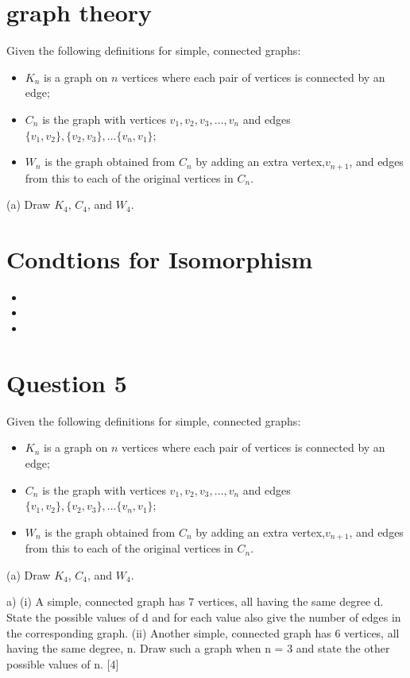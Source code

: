 \documentclass[]{report}
\begin{document}
\section{graph theory }
Given the following definitions for simple, connected graphs:
\begin{itemize}
\item $K_n$ is a graph on $n$ vertices where each pair of vertices is connected by an edge;
\item $C_n$ is the graph with vertices $v_1, v_2, v_3, \dots, v_n$ and edges $\{v_1,v_2\}, \{v_2,v_3\}, \dots\{v_n, v_1\}$;
\item $W_n$ is the graph obtained from $C_n$ by adding an extra vertex,$v_{n+1}$, and edges
from this to each of the original vertices in $C_n$.
\end{itemize}
(a) Draw $K_4$, $C_4$, and $W_4$. 
\newpage
\section*{Condtions for Isomorphism}
\begin{itemize}
\item
\item
\item
\end{itemize}

\section*{Question 5}
Given the following definitions for simple, connected graphs:
\begin{itemize}
	\item $K_n$ is a graph on $n$ vertices where each pair of vertices is connected by an edge;
	\item $C_n$ is the graph with vertices $v_1, v_2, v_3, \dots, v_n$ and edges $\{v_1,v_2\}, \{v_2,v_3\}, \dots\{v_n, v_1\}$;
	\item $W_n$ is the graph obtained from $C_n$ by adding an extra vertex,$v_{n+1}$, and edges
	from this to each of the original vertices in $C_n$.
\end{itemize}
(a) Draw $K_4$, $C_4$, and $W_4$. 

a) (i) A simple, connected graph has 7 vertices, all having the same degree d.
State the possible values of d and for each value also give the number of edges
in the corresponding graph.
(ii) Another simple, connected graph has 6 vertices, all having the same degree,
n. Draw such a graph when n = 3 and state the other possible values of n.
[4]
\end{document}
